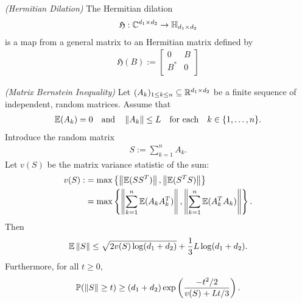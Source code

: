\begin{definition}
  \emph{(Hermitian Dilation)}
  The Hermitian dilation
  \begin{gather*}
    \mathfrak{H} : \mathbb{C}^{d_1 \times d_2} \to \mathbb{H}_{d_1 \times d_2}
  \end{gather*}
  is a map from a general matrix to an Hermitian matrix defined by
  \begin{gather}
    \label{ rmineq_hermitian_dilation } 
    \mathfrak{H}(B)
    :=
    \begin{bmatrix}
      0   & B \\
      B^* & 0 \\
    \end{bmatrix}
  \end{gather}
\end{definition}




\begin{theorem}
  \emph{(Matrix Bernstein Inequality)}
  \label{rmineq_bernstein}
  Let $(A_k)_{1\le k \le n}\subseteq\mathbb{R}^{d_1\times d_2}$ be a finite sequence of independent, random matrices. Assume that
    \begin{gather}
      \label{rmineq_bernstein_cond_1}
      \mathbb{E}(A_k)=0\quad\text{and}\quad\left\lVert A_k\right\rVert\le L \quad \text{for each}\quad  k\in \{1,\ldots,n\}.
    \end{gather}
    Introduce the random matrix
      \begin{gather*}
        S:=\sum_{k=1}^n A_k.
      \end{gather*}
    Let $v(S)$ be the matrix variance statistic of the sum:
      \begin{align}
        \label{rmineq_bernstein_cond_2}
        \begin{split}
        v(S):&=\max\left\{ \left\lVert\mathbb{E}(SS^T)\right\rVert, \left\lVert\mathbb{E}(S^T S)\right\rVert \right\}\\
             &=\max\left\{ \left\lVert\sum_{k=1}^n\mathbb{E}(A_kA_k^T)\right\rVert, \left\lVert\sum_{k=1}^n\mathbb{E}(A_k^T A_k)\right\rVert \right\}.
        \end{split}
      \end{align}
    Then
      \begin{align}
        \label{rmineq_bernstein_expectation_bound}
        \mathbb{E}\left\lVert S\right\rVert\le \sqrt{2v(S)\log(d_1+d_2)} + \frac{1}{3}L\log(d_1+d_2).
      \end{align}
    Furthermore, for all $t\ge 0$,
      \begin{gather}
        \label{rmineq_bernstein_probability_bound}
        \mathbb{P}(\left\lVert S\right\rVert\ge t)\ge(d_1+d_2)\exp\left(\frac{-t^2/2}{v(S)+Lt/3} \right).
      \end{gather}
\end{theorem}

